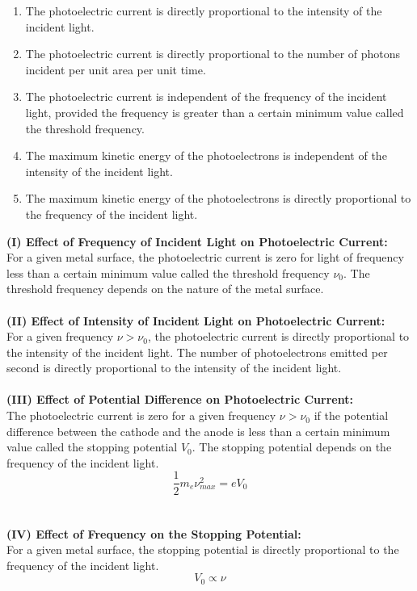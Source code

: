 \documentclass[12pt]{article}
\numberwithin{equation}{subsection}
\begin{document}
\begin{enumerate}
    \item The photoelectric current is directly proportional to the intensity of the incident light.
    \item The photoelectric current is directly proportional to the number of photons incident per unit area per unit time.
    \item The photoelectric current is independent of the frequency of the incident light, provided the frequency is greater than a certain minimum value called the threshold frequency.
    \item The maximum kinetic energy of the photoelectrons is independent of the intensity of the incident light.
    \item The maximum kinetic energy of the photoelectrons is directly proportional to the frequency of the incident light.
\end{enumerate}

\textbf{(I) Effect of Frequency of Incident Light on Photoelectric Current:} \\
For a given metal surface, the photoelectric current is zero for light of frequency less than a certain minimum value called the threshold frequency $\nu_0$. The threshold frequency depends on the nature of the metal surface. \\~\\

\textbf{(II) Effect of Intensity of Incident Light on Photoelectric Current:} \\
For a given frequency $\nu > \nu_0$, the photoelectric current is directly proportional to the intensity of the incident light. The number of photoelectrons emitted per second is directly proportional to the intensity of the incident light. \\~\\

\textbf{(III) Effect of Potential Difference on Photoelectric Current:} \\
The photoelectric current is zero for a given frequency $\nu > \nu_0$ if the potential difference between the cathode and the anode is less than a certain minimum value called the stopping potential $V_0$. The stopping potential depends on the frequency of the incident light. \[
    \frac{1}{2}m_{e}\nu_{max}^2 = eV_0
\] \\~\\

\textbf{(IV) Effect of Frequency on the Stopping Potential:} \\
For a given metal surface, the stopping potential is directly proportional to the frequency of the incident light. \[
    V_0 \propto \nu
\] \\~\\
\end{document}
